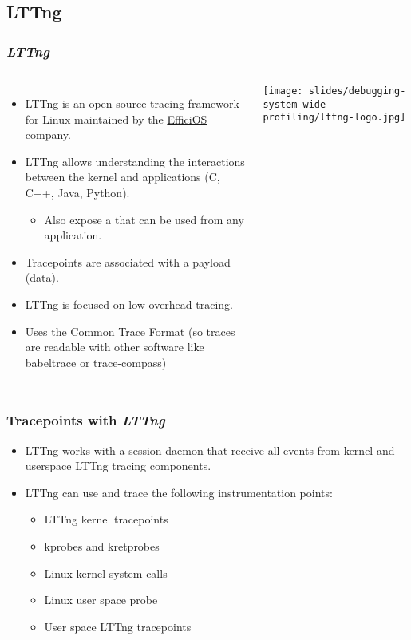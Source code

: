 \subsection{LTTng}

\begin{frame}
  \frametitle{{\em LTTng}}
  \begin{columns}
    \begin{itemize}
      \item LTTng is an open source tracing framework for Linux maintained by
            the \href{https://www.efficios.com/}{EfficiOS} company.
      \item LTTng allows understanding the interactions between the kernel and
            applications (C, C++, Java, Python).
      \begin{itemize}
        \item Also expose a  that can be used from any
              application.
      \end{itemize}
      \item Tracepoints are associated with a payload (data).
      \item LTTng is focused on low-overhead tracing.
      \item Uses the Common Trace Format (so traces are readable with other
      software like babeltrace or trace-compass)
    \end{itemize}
    \texttt{[image: slides/debugging-system-wide-profiling/lttng-logo.jpg]}
  \end{columns}
\end{frame}

\begin{frame}
  \frametitle{Tracepoints with {\em LTTng} }
  \begin{itemize}
    \item LTTng works with a session daemon that receive all events from kernel
          and userspace LTTng tracing components.
    \item LTTng can use and trace the following instrumentation points:
    \begin{itemize}
      \item LTTng kernel tracepoints
      \item kprobes and kretprobes
      \item Linux kernel system calls
      \item Linux user space probe
      \item User space LTTng tracepoints
    \end{itemize}
  \end{itemize}
\end{frame}

